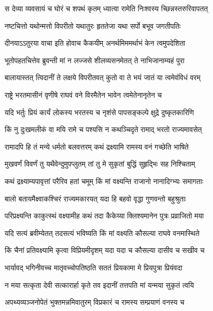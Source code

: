 \twolineshloka
{स देव्या व्यवसायं च घोरं च शपथं कृतम्}
{ध्यात्वा रामेति निःश्वस्य च्छिन्नस्तरुरिवापतत्} %

\twolineshloka
{नष्टचित्तो यथोन्मत्तो विपरीतो यथातुरः}
{हृततेजा यथा सर्पो बभूव जगतीपतिः} %

\twolineshloka
{दीनयाऽऽतुरया वाचा इति होवाच कैकयीम्}
{अनर्थमिममर्थाभं केन त्वमुपदेशिता} %

\twolineshloka
{भूतोपहतचित्तेव ब्रुवन्ती मां न लज्जसे}
{शीलव्यसनमेतत् ते नाभिजानाम्यहं पुरा} %

\twolineshloka
{बालायास्तत् त्विदानीं ते लक्षये विपरीतवत्}
{कुतो वा ते भयं जातं या त्वमेवंविधं वरम्} %

\twolineshloka
{राष्ट्रे भरतमासीनं वृणीषे राघवं वने}
{विरमैतेन भावेन त्वमेतेनानृतेन च} %

\twolineshloka
{यदि भर्तुः प्रियं कार्यं लोकस्य भरतस्य च}
{नृशंसे पापसङ्कल्पे क्षुद्रे दुष्कृतकारिणि} %

\twolineshloka
{किं नु दुःखमलीकं वा मयि रामे च पश्यसि}
{न कथञ्चिदृते रामाद् भरतो राज्यमावसेत्} %

\twolineshloka
{रामादपि हि तं मन्ये धर्मतो बलवत्तरम्}
{कथं द्रक्ष्यामि रामस्य वनं गच्छेति भाषिते} %

\twolineshloka
{मुखवर्णं विवर्णं तु यथैवेन्दुमुपप्लुतम्}
{तां तु मे सुकृतां बुद्धिं सुहृद्भिः सह निश्चिताम्} %

\twolineshloka
{कथं द्रक्ष्याम्यपावृत्तां परैरिव हतां चमूम्}
{किं मां वक्ष्यन्ति राजानो नानादिग्भ्यः समागताः} %

\twolineshloka
{बालो बतायमैक्ष्वाकश्चिरं राज्यमकारयत्}
{यदा हि बहवो वृद्धा गुणवन्तो बहुश्रुताः} %

\twolineshloka
{परिप्रक्ष्यन्ति काकुत्स्थं वक्ष्यामीह कथं तदा}
{कैकेय्या क्लिश्यमानेन पुत्रः प्रव्राजितो मया} %

\twolineshloka
{यदि सत्यं ब्रवीम्येतत् तदसत्यं भविष्यति}
{किं मां वक्ष्यति कौसल्या राघवे वनमास्थिते} %

\twolineshloka
{किं चैनां प्रतिवक्ष्यामि कृत्वा विप्रियमीदृशम्}
{यदा यदा च कौसल्या दासीव च सखीव च} %

\twolineshloka
{भार्यावद् भगिनीवच्च मातृवच्चोपतिष्ठति}
{सततं प्रियकामा मे प्रियपुत्रा प्रियंवदा} %

\twolineshloka
{न मया सत्कृता देवी सत्कारार्हा कृते तव}
{इदानीं तत्तपति मां यन्मया सुकृतं त्वयि} %

\twolineshloka
{अपथ्यव्यञ्जनोपेतं भुक्तमन्नमिवातुरम्}
{विप्रकारं च रामस्य सम्प्रयाणं वनस्य च} %

